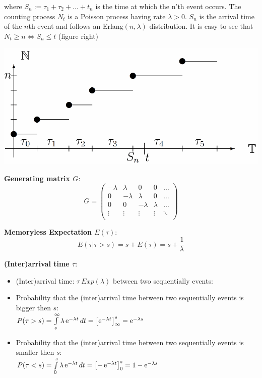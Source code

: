 \begin{aufzaehlung}
\begin{minipage}{11.25cm}
	where $S_n:=\tau_1+\tau_2+\ldots+t_n$ is the time at which the n'th event occurs.
	The counting process $N_t$ is a Poisson process having rate $\lambda>0$.
	$S_n$ is the arrival time of the $n$th event and follows an Erlang$(n,\lambda)$ distribution. It is easy to see that $N_t\geq n \Leftrightarrow S_n\leq t$ (figure right)
	\end{minipage}
	\hfill
	\begin{minipage}{6.25cm}
	\includegraphics[width=\textwidth]{Content/Markov/erlang}
	\end{minipage}
\end{aufzaehlung}


\begin{minipage}[t]{6.5cm}
\textbf{Generating matrix $G$}:
$$G=\begin{pmatrix}
-\lambda & \lambda & 0 & 0 &\ldots\\
0&-\lambda & \lambda & 0  &\ldots\\
0 & 0&-\lambda & \lambda & \ldots\\
\vdots&\vdots&\vdots&\vdots&\ddots\\
\end{pmatrix}$$

\vspace{0.25cm}

\textbf{Memoryless Expectation $E(\tau)$}:
$$E(\tau|\tau>s)=s+E(\tau)=s+\frac 1\lambda$$

\end{minipage}
\hfill
\begin{minipage}[t]{12.5cm}
\textbf{(Inter)arrival time $\tau$}:
\begin{itemize}
\item (Inter)arrival time: $\tau~Exp(\lambda)$ between two sequentially events:
\item Probability that the (inter)arrival time between two sequentially events is bigger then $s$:\\
 $P(\tau>s)=\int\limits_{s}^{\infty}{\lambda\operatorname{\mathrm e}^{-\lambda t}dt}=\left[\operatorname{\mathrm e}^{-\lambda t}\right]_\infty^s=\operatorname{\mathrm e}^{-\lambda s}$
\item Probability that the (inter)arrival time between two sequentially events is smaller then $s$:\\
 $P(\tau<s)=\int\limits_{0}^{s}{\lambda\operatorname{\mathrm e}^{-\lambda t}dt}=\left[-\operatorname{\mathrm e}^{-\lambda t}\right]_0^s=1-\operatorname{\mathrm e}^{-\lambda s}$
\end{itemize}
\end{minipage}

